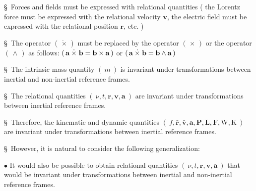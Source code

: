 \documentclass[10pt,fleqn]{article}
\begin{document}
\vspace{-0.60em}

\par {}

\bigskip \smallskip

\noindent \S \ Forces and fields must be expressed with relational quantities ( the Lorentz force must be expressed with the relational velocity {\small $\mathbf{v}$}, the electric field must be expressed with the relational position {\small $\mathbf{r}$}, etc. )
\par \bigskip \smallskip
\noindent \S \ The operator {\small $( \, \dot{\times} \, )$} must be replaced by the operator {\small $( \, \times \, )$} or the operator {\small $( \, \wedge \, )$} as follows: {\small $( \, \mathbf{a} \hspace{+0.24em}\dot{\times}\hspace{+0.30em} \mathbf{b} = \mathbf{b} \times \mathbf{a} \, )$} or {\small $( \, \mathbf{a} \hspace{+0.24em}\dot{\times}\hspace{+0.30em} \mathbf{b} = \mathbf{b} \wedge \mathbf{a} \, )$}
\par \bigskip \smallskip
\noindent \S \ The intrinsic mass quantity {\small $( \: m \: )$} is invariant under transformations between inertial and non-inertial reference frames.
\par \bigskip \smallskip
\noindent \S \ The relational quantities {\small $( \: \nu, t, \mathbf{r}, \mathbf{v}, \mathbf{a} \: )$} are invariant under transformations between inertial reference frames.
\par \bigskip \smallskip
\noindent \S \ Therefore, the kinematic and dynamic quantities {\small $( \: f, \bar{\mathbf{r}}, \bar{\mathbf{v}}, \bar{\mathbf{a}}, \mathbf{P}, \mathbf{L}, \mathbf{F}, \mathrm{W}, \mathrm{K} \: )$} are invariant under transformations between inertial reference frames.
\par \bigskip \smallskip
\noindent \S \ However, it is natural to consider the following generalization:
\par \bigskip \smallskip
\noindent $\bullet$ It would also be possible to obtain relational quantities {\small $( \: \nu, t, \mathbf{r}, \mathbf{v}, \mathbf{a} \: )$} that would be invariant under transformations between inertial and non\hspace{+0.03em}-\hspace{+0.03em}inertial \hbox {reference} frames.
\end{document}
